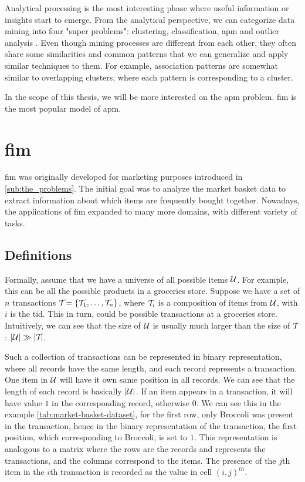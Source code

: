 Analytical processing is the most interesting phase where useful information or insights start to emerge.
From the analytical perspective, we can categorize data mining into four "super problems": clustering, classification, \ac{apm} and outlier analysis \citep{Aggarwal15}.
Even though mining processes are different from each other, they often share some similarities and common patterns that we can generalize and apply similar techniques to them.
For example, association patterns are somewhat similar to overlapping clusters, where each pattern is corresponding to a cluster.

In the scope of this thesis, we will be more interested on the \acl{apm} problem.
\Acl{fim} \citep{borgelt_fim_2012} is the most popular model of \acl{apm}.


\section{\Acl{fim}}
\label{sec:fim}
\Acl{fim} was originally developed for marketing purposes introduced in \autoref{sub:the_problems}.
The initial goal was to analyze the market basket data to extract information about which items are frequently bought together.
Nowadays, the applications of \acl{fim} expanded to many more domains, with different variety of tasks.

\subsection{Definitions}
Formally, assume that we have a universe of all possible items $\mathcal{U}$.
For example, this can be all the possible products in a groceries store.
Suppose we have a set of $\mathit{n}$ transactions $\mathcal{T}_{} = \{\mathcal{T}_{1}, \dots, \mathcal{T}_{n}\}{}$, where $\mathcal{T}_{i}$ is a composition of items from $\mathcal{U}$, with $i$ is the \ac{tid}.
This in turn, could be possible transactions at a groceries store.
Intuitively, we can see that the size of $\mathcal{U}$ is usually much larger than the size of $\mathcal{T}_{}$: $|\mathcal{U}| \gg |\mathcal{T}_{} |$.

Such a collection of transactions can be represented in binary representation, where all records have the same length, and each record represents a transaction.
One item in $\mathcal{U}$ will have it own same position in all records.
We can see that the length of each record is basically $|\mathcal{U}|$.
If an item appears in a transaction, it will have value $1$ in the corresponding record, otherwise $0$.
We can see this in the example \autoref{tab:market-basket-dataset}, for the first row, only Broccoli was present in the transaction, hence in the binary representation of the transaction, the first position, which corresponding to Broccoli, is set to $1$.
This representation is analogous to a matrix where the rows are the records and represents the transactions, and the columns correspond to the items.
The presence of the $\mathit{j}$th item in the $\mathit{i}$th transaction is recorded as the value in cell $\mathit{(i, j)}^{th}$.

